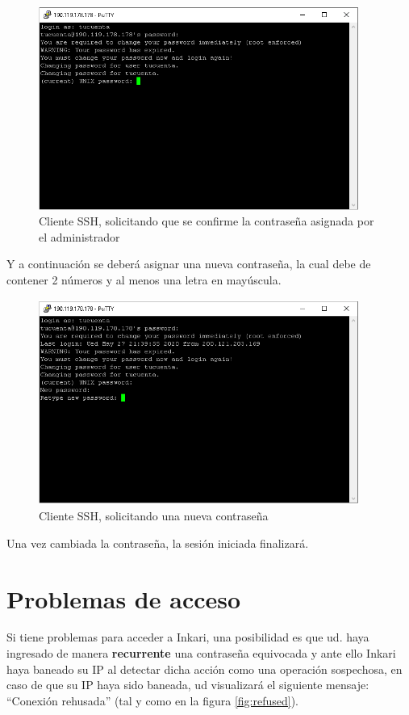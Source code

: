 \documentclass[a4paper,11pt]{article}
\begin{document}
\begin{figure}[!ht]
    \centering
    \includegraphics[width=10.5cm]{ssh_conf_old}
    \caption{Cliente SSH, solicitando que se confirme la contraseña asignada por el administrador}
\end{figure}

Y a continuación se deberá asignar una nueva contraseña, la cual debe de contener 2 números y al menos una letra en mayúscula.

\begin{figure}[!ht]
    \centering
    \includegraphics[width=10.5cm]{ssh_nueva_pass}
    \caption{Cliente SSH, solicitando una nueva contraseña}
\end{figure}

Una vez cambiada la contraseña, la sesión iniciada finalizará.

\section{Problemas de acceso}

Si tiene problemas para acceder a Inkari, una posibilidad es que ud. haya ingresado de manera \textbf{recurrente} una contraseña equivocada y ante ello Inkari haya baneado su IP al detectar dicha acción como una operación sospechosa, en caso de que su IP haya sido baneada, ud visualizará el siguiente mensaje: ``Conexión rehusada'' (tal y como en la figura \ref{fig:refused}).
\end{document}
